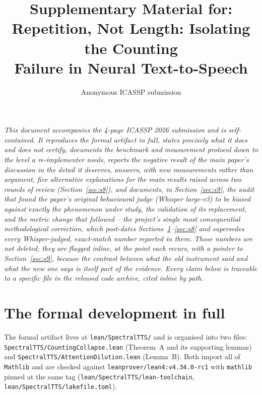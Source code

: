 \documentclass[11pt]{article}
\title{Supplementary Material for:\\[2pt]
\large Repetition, Not Length: Isolating the Counting\\
Failure in Neural Text-to-Speech}
\author{Anonymous ICASSP submission}
\date{}
\begin{document}
\maketitle

\vspace{-2.5em}
\begin{center}
\emph{This document accompanies the 4-page ICASSP 2026 submission and is
self-contained. It reproduces the formal artifact in full, states precisely
what it does and does not certify, documents the benchmark and measurement
protocol down to the level a re-implementer needs, reports the negative
result of the main paper's discussion in the detail it deserves, answers,
with new measurements rather than argument, five alternative explanations
for the main results raised across two rounds of review
(Section~\ref{sec:s8}), and documents, in Section~\ref{sec:s9}, the audit
that found the paper's original behavioural judge (Whisper large-v3) to be
biased against exactly the phenomenon under study, the validation of its
replacement, and the metric change that followed -- the project's single
most consequential methodological correction, which post-dates
Sections~\ref{sec:s1}--\ref{sec:s8} and supersedes every Whisper-judged,
exact-match number reported in them. Those numbers are not deleted; they are
flagged inline, at the point each recurs, with a pointer to
Section~\ref{sec:s9}, because the contrast between what the old instrument
said and what the new one says is itself part of the evidence. Every claim
below is traceable to a specific file in the released code archive, cited
inline by path.}
\end{center}

\tableofcontents

\section{The formal development in full}
\label{sec:s1}

The formal artifact lives at \texttt{lean/SpectralTTS/} and is organised into
two files: \texttt{SpectralTTS/CountingCollapse.lean} (Theorem~A and its
supporting lemmas) and \texttt{SpectralTTS/AttentionDilution.lean} (Lemma~B).
Both import all of \texttt{Mathlib} and are checked against
\texttt{leanprover/lean4:v4.34.0-rc1} with \texttt{mathlib} pinned at the same
tag (\texttt{lean/SpectralTTS/lean-toolchain},
\texttt{lean/SpectralTTS/lakefile.toml}).
\end{document}
